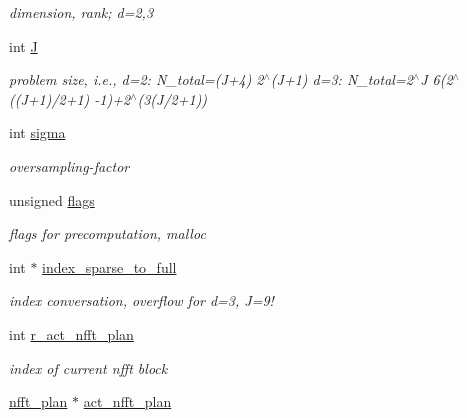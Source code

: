 \begin{CompactItemize}
\begin{CompactList}\small\item\em dimension, rank; d=2,3 \item\end{CompactList}\item 
\hypertarget{structnsfft__plan_o5}{
int \hyperlink{structnsfft__plan_o5}{J}}
\label{structnsfft__plan_o5}

\begin{CompactList}\small\item\em problem size, i.e., d=2: N\_\-total=(J+4) 2$^\wedge$(J+1) d=3: N\_\-total=2$^\wedge$J 6(2$^\wedge$((J+1)/2+1) -1)+2$^\wedge$(3(J/2+1)) \item\end{CompactList}\item 
\hypertarget{structnsfft__plan_o6}{
int \hyperlink{structnsfft__plan_o6}{sigma}}
\label{structnsfft__plan_o6}

\begin{CompactList}\small\item\em oversampling-factor \item\end{CompactList}\item 
\hypertarget{structnsfft__plan_o7}{
unsigned \hyperlink{structnsfft__plan_o7}{flags}}
\label{structnsfft__plan_o7}

\begin{CompactList}\small\item\em flags for precomputation, malloc \item\end{CompactList}\item 
\hypertarget{structnsfft__plan_o8}{
int $\ast$ \hyperlink{structnsfft__plan_o8}{index\_\-sparse\_\-to\_\-full}}
\label{structnsfft__plan_o8}

\begin{CompactList}\small\item\em index conversation, overflow for d=3, J=9! \item\end{CompactList}\item 
\hypertarget{structnsfft__plan_o9}{
int \hyperlink{structnsfft__plan_o9}{r\_\-act\_\-nfft\_\-plan}}
\label{structnsfft__plan_o9}

\begin{CompactList}\small\item\em index of current nfft block \item\end{CompactList}\item 
\hypertarget{structnsfft__plan_o10}{
\hyperlink{structnfft__plan}{nfft\_\-plan} $\ast$ \hyperlink{structnsfft__plan_o10}{act\_\-nfft\_\-plan}}
\label{structnsfft__plan_o10}


\end{CompactItemize}
